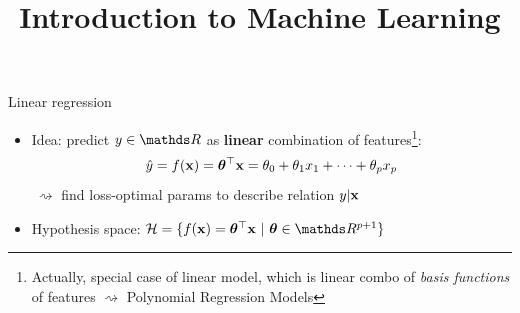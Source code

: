 \documentclass[11pt,compress,t,notes=noshow, xcolor=table]{beamer}
\title{Introduction to Machine Learning}
\institute{\href{https://compstat-lmu.github.io/lecture_i2ml/}{compstat-lmu.github.io/lecture\_i2ml}}
\date{}
\begin{document}


\begin{frame}{Linear regression}

\begin{itemize}
    \item Idea: predict $y \in \R$ as \textbf{linear} combination of 
    features\footnote[frame]{\tiny
    Actually, special case of linear model, which is linear combo of 
    \textit{basis functions} of features $\rightsquigarrow$
    Polynomial Regression Models
    }:
    $$\hat{y} = f(\mathbf{x}) = \bm{\theta}^\top \mathbf{x} = \theta_0 + \theta_1 x_1 + \dots + \theta_p x_p$$
    $~\rightsquigarrow$ find loss-optimal params to describe relation 
    $y | \mathbf{x}$
    \item Hypothesis space: $\Hspace = \{\fx = \thx\ |\ \thetab \in \R^{p+1} \}$
    

\end{itemize}
\end{frame}
\end{document}
